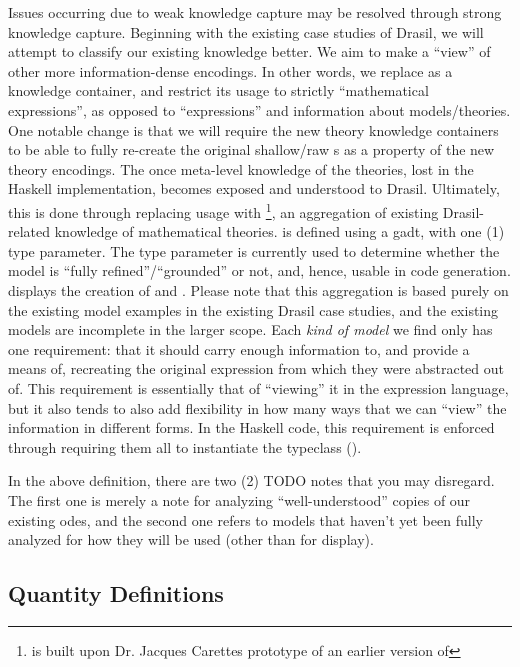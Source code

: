 Issues occurring due to weak knowledge capture may be resolved through strong
knowledge capture. Beginning with the existing case studies of Drasil, we will
attempt to classify our existing knowledge better. We aim to make
\RelationConcept{} a ``view'' of other more information-dense encodings. In
other words, we replace \Expr{} as a knowledge container, and restrict its usage
to strictly ``mathematical expressions'', as opposed to ``expressions'' and
information about models/theories. One notable change is that we will require
the new theory knowledge containers to be able to fully re-create the original
shallow/raw \Expr{}s as a property of the new theory encodings. The once
meta-level knowledge of the theories, lost in the Haskell implementation,
becomes exposed and understood to Drasil. Ultimately, this is done through
replacing \RelationConcept{} usage with \ModelKind{}\footnote{\ModelKind{} is
built upon Dr. Jacques Carettes prototype of an earlier version of
\ModelKinds{}}, an aggregation of existing Drasil-related knowledge of
mathematical theories. \ModelKind{} is defined using a \acs{gadt}, with one (1)
type parameter. The type parameter is currently used to determine whether the
model is ``fully refined''/``grounded'' or not, and, hence, usable in code
generation.  displays the creation of \ModelKind{}
and \ModelKinds{}. Please note that this aggregation is based purely on the
existing model examples in the existing Drasil case studies, and the existing
models are incomplete in the larger scope. Each \textit{kind of model} we find
only has one requirement: that it should carry enough information to, and
provide a means of, recreating the original expression from which they were
abstracted out of. This requirement is essentially that of ``viewing'' it in the
expression language, but it also tends to also add flexibility in how many ways
that we can ``view'' the information in different forms. In the Haskell code,
this requirement is enforced through requiring them all to instantiate the
\Express{} typeclass ().

\currentModelKindsHaskell{}

In the above \ModelKinds{} definition, there are two (2) TODO notes that you may
disregard. The first one is merely a note for analyzing ``well-understood''
copies of our existing \acsp{ode}, and the second one refers to models that
haven't yet been fully analyzed for how they will be used (other than for
display).

\subsection{Quantity Definitions}

